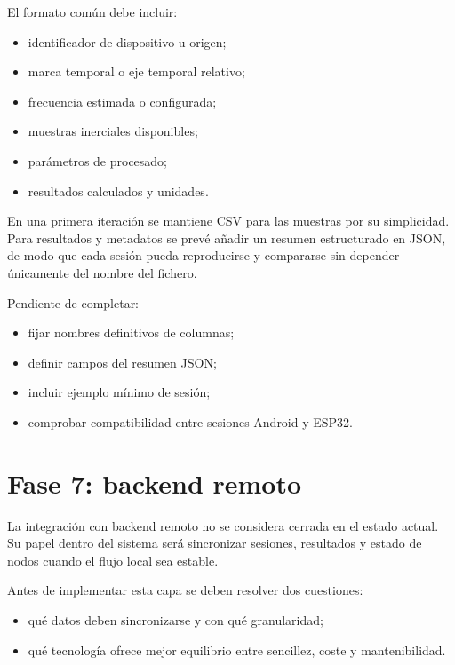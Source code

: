 El formato común debe incluir:

\begin{itemize}
  \item identificador de dispositivo u origen;
  \item marca temporal o eje temporal relativo;
  \item frecuencia estimada o configurada;
  \item muestras inerciales disponibles;
  \item parámetros de procesado;
  \item resultados calculados y unidades.
\end{itemize}

En una primera iteración se mantiene CSV para las muestras por su simplicidad. Para resultados y metadatos se prevé añadir un resumen estructurado en JSON, de modo que cada sesión pueda reproducirse y compararse sin depender únicamente del nombre del fichero.

\begin{temporalblock}
Pendiente de completar:
\begin{itemize}
  \item fijar nombres definitivos de columnas;
  \item definir campos del resumen JSON;
  \item incluir ejemplo mínimo de sesión;
  \item comprobar compatibilidad entre sesiones Android y ESP32.
\end{itemize}
\end{temporalblock}

\section{Fase 7: backend remoto}

La integración con backend remoto no se considera cerrada en el estado actual. Su papel dentro del sistema será sincronizar sesiones, resultados y estado de nodos cuando el flujo local sea estable.

Antes de implementar esta capa se deben resolver dos cuestiones:

\begin{itemize}
  \item qué datos deben sincronizarse y con qué granularidad;
  \item qué tecnología ofrece mejor equilibrio entre sencillez, coste y mantenibilidad.
\end{itemize}

